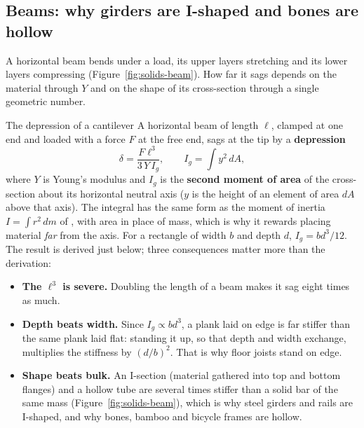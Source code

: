 \subsection{Beams: why girders are I-shaped and bones are hollow}

A horizontal beam bends under a load, its upper layers stretching and its lower layers compressing
(Figure~\ref{fig:solids-beam}). How far it sags depends on the material through $Y$ and on the shape of
its cross-section through a single geometric number.

\begin{figure}[htbp]
\centering
{}
\end{figure}

\begin{defbox}{The depression of a cantilever}
A horizontal beam of length $\ell$, clamped at one end and loaded with a force $F$ at the free end, sags at
the tip by a \textbf{depression}
\[
\delta=\frac{F\ell^{3}}{3\,Y\,I_g},\qquad I_g=\int y^{2}\,dA ,
\]
where $Y$ is Young's modulus and $I_g$ is the \textbf{second moment of area} of the cross-section about its
horizontal neutral axis ($y$ is the height of an element of area $dA$ above that axis). The integral has
the same form as the moment of inertia $I=\int r^{2}\,dm$ of , with area in place of
mass, which is why it rewards placing material \emph{far} from the axis. For a rectangle of width $b$ and
depth $d$, $I_g=bd^{3}/12$. The result is derived just below; three consequences matter more than the
derivation:
\begin{itemize}
\item \textbf{The $\ell^{3}$ is severe.} Doubling the length of a beam makes it sag eight times as much.
\item \textbf{Depth beats width.} Since $I_g\propto bd^{3}$, a plank laid on edge is far stiffer than the
      same plank laid flat: standing it up, so that depth and width exchange, multiplies the stiffness by
      $(d/b)^{2}$. That is why floor joists stand on edge.
\item \textbf{Shape beats bulk.} An I-section (material gathered into top and bottom flanges) and a hollow
      tube are several times stiffer than a solid bar of the same mass (Figure~\ref{fig:solids-beam}),
      which is why steel girders and rails are I-shaped, and why bones, bamboo and bicycle frames are
      hollow.
\end{itemize}
\end{defbox}

